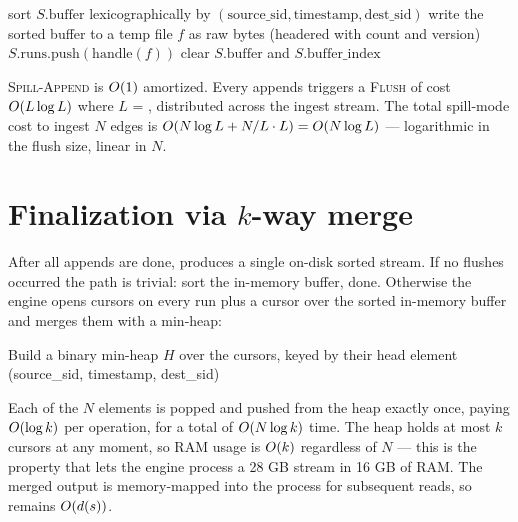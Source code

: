 \begin{algorithm}
\caption{\textsc{Flush-Buffer-To-Run}}\label{alg:spill-flush}
sort $S.\text{buffer}$ lexicographically by $(\text{source\_sid},
\text{timestamp}, \text{dest\_sid})$\;
write the sorted buffer to a temp file $f$ as raw bytes (headered
with count and version)\;
$S.\text{runs}.\text{push}(\text{handle}(f))$\;
clear $S.\text{buffer}$ and $S.\text{buffer\_index}$\;
\end{algorithm}

\begin{complexity}
\textsc{Spill-Append} is $O(1)$ amortized. Every
 appends triggers a \textsc{Flush} of cost
$O(L \log L)$ where $L$ = , distributed across
the ingest stream. The total spill-mode cost to ingest $N$ edges is
$O(N \log L + N/L \cdot L) = O(N \log L)$ --- logarithmic in
the flush size, linear in $N$.
\end{complexity}

\section{Finalization via $k$-way merge}

After all appends are done,  produces a single on-disk
sorted stream. If no flushes occurred the path is trivial: sort the
in-memory buffer, done. Otherwise the engine opens cursors on every
run plus a cursor over the sorted in-memory buffer and merges them
with a min-heap:

\begin{algorithm}
\caption{\textsc{K-Way-Merge}}\label{alg:kway-merge}
Build a binary min-heap $H$ over the cursors, keyed by their head
element (source\_sid, timestamp, dest\_sid)\;
\end{algorithm}

\begin{complexity}
Each of the $N$ elements is popped and pushed from the heap exactly
once, paying $O(\log k)$ per operation, for a total of
$O(N \log k)$ time. The heap holds at most $k$ cursors at any
moment, so RAM usage is $O(k)$ regardless of $N$ --- this is the
property that lets the engine process a 28 GB stream in 16 GB of
RAM. The merged output is memory-mapped into the process for
subsequent reads, so  remains $O(d(s))$.
\end{complexity}

